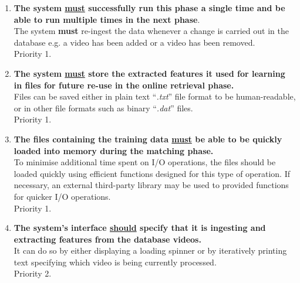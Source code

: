 \begin{enumerate}[label=F\arabic*]

    \item \textbf{The system \underline{must} successfully run this phase a single time and be able to run multiple times in the next phase}.\\
    The system \textbf{must} re-ingest the data whenever a change is carried out in the database e.g. a video has been added or a video has been removed.\\
    Priority 1.
    
    \item \textbf{The system \underline{must} store the extracted features it used for learning in files for future re-use in the online retrieval phase.}\\
    Files can be saved either in plain text ``\textit{.txt}'' file format to be human-readable, or in other file formats such as binary ``\textit{.dat}'' files.\\
    Priority 1.
    
    \item \textbf{The files containing the training data \underline{must} be able to be quickly loaded into memory during the matching phase.}\\
    To minimise additional time spent on I/O operations, the files should be loaded quickly using efficient functions designed for this type of operation. If necessary, an external third-party library may be used to provided functions for quicker I/O operations.\\
    Priority 1.
    
    
    \item \textbf{The system's interface \underline{should} specify that it is ingesting and extracting features from the database videos.}\\
    It can do so by either displaying a loading spinner or by iteratively printing text specifying which video is being currently processed.\\
    Priority 2.
    
\end{enumerate}

